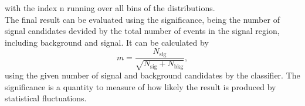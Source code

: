 with the index n running over all bins of the distributions.\\
The final result can be evaluated using the significance, being the number of signal candidates devided by the total number of events in the signal region, including background and signal.
It can be calculated by
\begin{equation}
    \label{eq:sign}
    m = \frac{N_{\mathrm{sig}}}{\sqrt{N_{\mathrm{sig}} + N_{\mathrm{bkg}}}},
\end{equation}
using the given number of signal and background candidates by the classifier. The significance is a quantity to measure of how likely the result is produced by statistical fluctuations.
